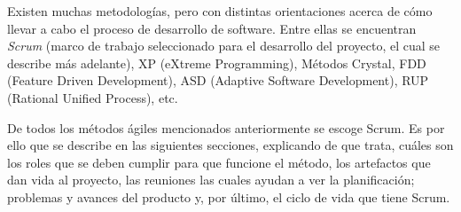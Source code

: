 Existen muchas metodologías, pero con distintas orientaciones acerca de cómo llevar a cabo el proceso de desarrollo de software. Entre ellas se encuentran \emph{Scrum} (marco de trabajo seleccionado para el desarrollo del proyecto, el cual se describe más adelante), XP (eXtreme Programming), Métodos Crystal, FDD (Feature Driven Development), ASD (Adaptive Software Development), RUP (Rational Unified Process), etc.

De todos los métodos ágiles mencionados anteriormente se escoge Scrum. Es por ello que se describe en las siguientes secciones, explicando de que trata, cuáles son los roles que se deben cumplir para que funcione el método, los artefactos que dan vida al proyecto, las reuniones las cuales ayudan a ver la planificación; problemas y avances del producto y, por último, el ciclo de vida que tiene Scrum.
